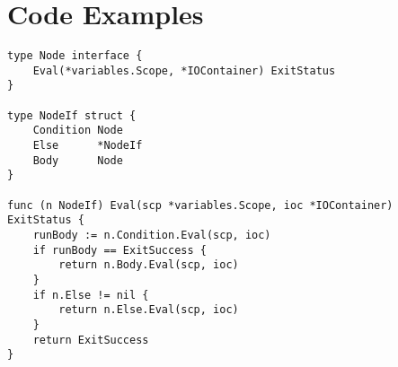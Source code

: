 \chapter{Code Examples}

\begin{lstlisting}[label=code:node-interface,caption={[The Node Interface]\\The Node interface used in the AST.\\ Also shows the NodeIf as an example of implementation.\\ Interfaces are implicitly satisfied if the type has the required methods.},frame=tb]
type Node interface {
	Eval(*variables.Scope, *IOContainer) ExitStatus
}

type NodeIf struct {
	Condition Node
	Else      *NodeIf
	Body      Node
}

func (n NodeIf) Eval(scp *variables.Scope, ioc *IOContainer) ExitStatus {
	runBody := n.Condition.Eval(scp, ioc)
	if runBody == ExitSuccess {
		return n.Body.Eval(scp, ioc)
	}
	if n.Else != nil {
		return n.Else.Eval(scp, ioc)
	}
	return ExitSuccess
}     
\end{lstlisting}
